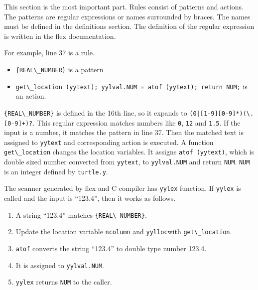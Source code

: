 This section is the most important part. Rules consist of patterns and
actions. The patterns are regular expressions or names surrounded by
braces. The names must be defined in the definitions section. The
definition of the regular expression is written in the flex
documentation.

For example, line 37 is a rule.

\begin{itemize}
\tightlist
\item
  \passthrough{\lstinline!\{REAL\_NUMBER\}!} is a pattern
\item
  \passthrough{\lstinline!get\_location (yytext); yylval.NUM = atof (yytext); return NUM;!}
  is an action.
\end{itemize}

\passthrough{\lstinline!\{REAL\_NUMBER\}!} is defined in the 16th line,
so it expands to \passthrough{\lstinline!(0|[1-9][0-9]*)(\\.[0-9]+)?!}.
This regular expression matches numbers like
\passthrough{\lstinline!0!}, \passthrough{\lstinline!12!} and
\passthrough{\lstinline!1.5!}. If the input is a number, it matches the
pattern in line 37. Then the matched text is assigned to
\passthrough{\lstinline!yytext!} and corresponding action is executed. A
function \passthrough{\lstinline!get\_location!} changes the location
variables. It assigns \passthrough{\lstinline!atof (yytext)!}, which is
double sized number converted from \passthrough{\lstinline!yytext!}, to
\passthrough{\lstinline!yylval.NUM!} and return
\passthrough{\lstinline!NUM!}. \passthrough{\lstinline!NUM!} is an
integer defined by \passthrough{\lstinline!turtle.y!}.

The scanner generated by flex and C compiler has
\passthrough{\lstinline!yylex!} function. If
\passthrough{\lstinline!yylex!} is called and the input is ``123.4'',
then it works as follows.

\begin{enumerate}
\def\labelenumi{\arabic{enumi}.}
\tightlist
\item
  A string ``123.4'' matches \passthrough{\lstinline!\{REAL\_NUMBER\}!}.
\item
  Update the location variable \passthrough{\lstinline!ncolumn!} and
  \passthrough{\lstinline!yylloc!}with
  \passthrough{\lstinline!get\_location!}.
\item
  \passthrough{\lstinline!atof!} converts the string ``123.4'' to double
  type number 123.4.
\item
  It is assigned to \passthrough{\lstinline!yylval.NUM!}.
\item
  \passthrough{\lstinline!yylex!} returns \passthrough{\lstinline!NUM!}
  to the caller.
\end{enumerate}

